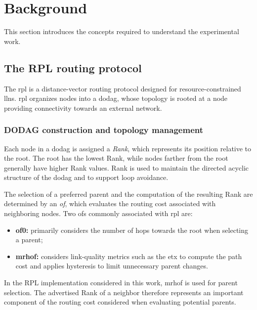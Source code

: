 \section{Background}
\label{sec:background}

This section introduces the concepts required to understand the experimental work.

\subsection{The RPL routing protocol}
\label{subsec:rpl_protocol}

The \gls{rpl} is a distance-vector routing protocol designed for resource-constrained \glspl{lln}. 
\gls{rpl} organizes nodes into a \gls{dodag}, whose topology is rooted at a node providing connectivity towards an external network.

\subsubsection{DODAG construction and topology management}

Each node in a \gls{dodag} is assigned a \textit{Rank}, which represents its position relative to the root. 
The root has the lowest Rank, while nodes farther from the root generally have higher Rank values. 
Rank is used to maintain the directed acyclic structure of the \gls{dodag} and to support loop avoidance.

The selection of a preferred parent and the computation of the resulting Rank are determined by an \textit{\gls{of}}, which evaluates the routing cost associated with neighboring nodes. 
Two \glspl{of} commonly associated with \gls{rpl} are:

\begin{itemize}
    \item \textbf{\gls{of0}:} primarily considers the number of hops towards the root when selecting a parent;
    \item \textbf{\gls{mrhof}:} considers link-quality metrics such as the \gls{etx} to compute the path cost and applies hysteresis to limit unnecessary parent changes.
\end{itemize}

In the RPL implementation considered in this work, \gls{mrhof} is used for parent selection. 
The advertised Rank of a neighbor therefore represents an important component of the routing cost considered when evaluating potential parents.

